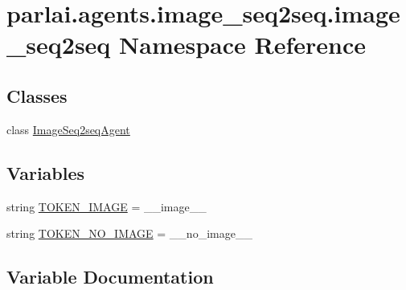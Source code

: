 \hypertarget{namespaceparlai_1_1agents_1_1image__seq2seq_1_1image__seq2seq}{}\section{parlai.\+agents.\+image\+\_\+seq2seq.\+image\+\_\+seq2seq Namespace Reference}
\label{namespaceparlai_1_1agents_1_1image__seq2seq_1_1image__seq2seq}
\subsection*{Classes}
\begin{DoxyCompactItemize}
\item 
class \hyperlink{classparlai_1_1agents_1_1image__seq2seq_1_1image__seq2seq_1_1ImageSeq2seqAgent}{Image\+Seq2seq\+Agent}
\end{DoxyCompactItemize}
\subsection*{Variables}
\begin{DoxyCompactItemize}
\item 
string \hyperlink{namespaceparlai_1_1agents_1_1image__seq2seq_1_1image__seq2seq_ac93dc765d4ea96db3e802dfd95474e80}{T\+O\+K\+E\+N\+\_\+\+I\+M\+A\+GE} = \textquotesingle{}\+\_\+\+\_\+image\+\_\+\+\_\+\textquotesingle{}
\item 
string \hyperlink{namespaceparlai_1_1agents_1_1image__seq2seq_1_1image__seq2seq_a9de6ff530424563339858777256ca1eb}{T\+O\+K\+E\+N\+\_\+\+N\+O\+\_\+\+I\+M\+A\+GE} = \textquotesingle{}\+\_\+\+\_\+no\+\_\+image\+\_\+\+\_\+\textquotesingle{}
\end{DoxyCompactItemize}


\subsection{Variable Documentation}
\mbox{\label{namespaceparlai_1_1agents_1_1image__seq2seq_1_1image__seq2seq_ac93dc765d4ea96db3e802dfd95474e80}} 
